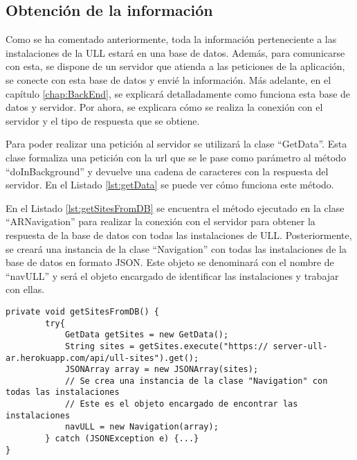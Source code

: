  

\subsection{Obtención de la información}

Como se ha comentado anteriormente, toda la información perteneciente a las instalaciones de la ULL estará en una base de datos. Además, para comunicarse con esta, se dispone de un servidor que atienda a las peticiones de la aplicación, se conecte con esta base de datos y  envié la información. Más adelante, en el capítulo \ref{chap:BackEnd}, se explicará detalladamente como funciona esta base de datos y servidor. Por ahora, se explicara cómo se realiza la conexión con el servidor y el tipo de respuesta que se obtiene.

Para poder realizar una petición al servidor se utilizará la clase ``GetData''. Esta clase formaliza una petición con la url que se le pase como parámetro al método ``doInBackground'' y devuelve una cadena de caracteres con la respuesta del servidor. En el Listado \ref{lst:getData} se puede ver cómo funciona este método. 

 

En el Listado \ref{lst:getSitesFromDB} se encuentra el método ejecutado en la clase ``ARNavigation'' para realizar la conexión con el servidor para obtener la respuesta de la base de datos con todas las instalaciones de ULL. Posteriormente, se creará una instancia de la clase ``Navigation'' con todas las instalaciones de la base de datos en formato JSON. Este objeto se denominará con el nombre de ``navULL'' y será el objeto encargado de identificar las instalaciones y trabajar con ellas.

\bigskip
\bigskip
\bigskip
\bigskip

\begin{lstlisting}[caption={Método que conecta con el servidor y recibe la respuesta con todas las instalaciones de la base de datos.},  label={lst:getSitesFromDB}]
    private void getSitesFromDB() {
        try{
            GetData getSites = new GetData();
            String sites = getSites.execute("https:// server-ull-ar.herokuapp.com/api/ull-sites").get();
            JSONArray array = new JSONArray(sites);
            // Se crea una instancia de la clase "Navigation" con todas las instalaciones
            // Este es el objeto encargado de encontrar las instalaciones
            navULL = new Navigation(array); 
        } catch (JSONException e) {...}
}
\end{lstlisting}

